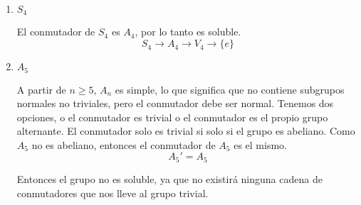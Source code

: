 \begin{enumerate}
    \item $S_{4}$

    El conmutador de $S_{4}$ es $A_{4}$, por lo tanto es soluble.
    \begin{equation}
        S_{4} \to A_{4} \to V_{4} \to \{e\}
    \end{equation}

    \item $A_5$

    A partir de $n\ge 5$, $A_{n}$ es simple, lo que significa que no contiene subgrupos normales no triviales, pero el conmutador debe ser normal. Tenemos dos opciones, o el conmutador es trivial o el conmutador es el propio grupo alternante. El conmutador solo es trivial si solo si el grupo es abeliano. Como $A_{5}$ no es abeliano, entonces el conmutador de $A_{5}$ es el mismo.
    \begin{equation}
        A_{5}' = A_{5}
    \end{equation}

    Entonces el grupo no es soluble, ya que no existirá ninguna cadena de conmutadores que nos lleve al grupo trivial.
\end{enumerate}
